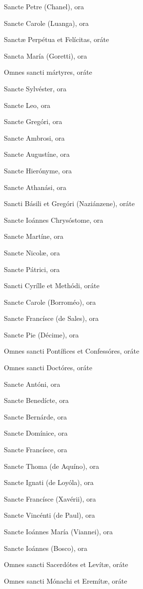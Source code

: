 \documentclass[12pt,a6paper]{book}
\begin{document}
\begin{sloppy}
Sancte Petre (Chanel), ora

Sancte Carole (Luanga), ora

Sanctæ Perpétua et Felícitas, oráte

Sancta María (Goretti), ora

Omnes sancti mártyres, oráte

\vspace{3mm}

Sancte Sylvéster, ora

Sancte Leo, ora

Sancte Gregóri, ora

Sancte Ambrosi, ora

Sancte Augustíne, ora

Sancte Hierónyme, ora

Sancte Athanási, ora

Sancti Básili et Gregóri (Naziánzene), oráte

Sancte Ioánnes Chrysóstome, ora

Sancte Martíne, ora

Sancte Nicolæ, ora

Sancte Pátrici, ora

Sancti Cyrílle et Methódi, oráte

Sancte Carole (Borroméo), ora

Sancte Francísce (de Sales), ora

Sancte Pie (Décime), ora

Omnes sancti Pontífices et Confessóres, oráte

Omnes sancti Doctóres, oráte

\vspace{3mm}

Sancte Antóni, ora

Sancte Benedícte, ora

Sancte Bernárde, ora

Sancte Domínice, ora

Sancte Francísce, ora

Sancte Thoma (de Aquíno), ora

Sancte Ignati (de Loyóla), ora

Sancte Francísce (Xavérii), ora

Sancte Vincénti (de Paul), ora

Sancte Ioánnes María (Viannei), ora

Sancte Ioánnes (Bosco), ora

Omnes sancti Sacerdótes et Levítæ, oráte

Omnes sancti Mónachi et Eremítæ, oráte


\end{sloppy}
\end{document}

